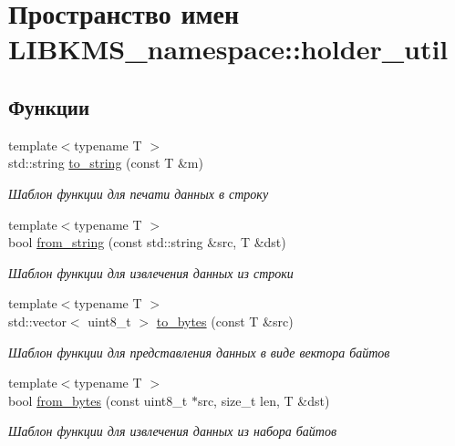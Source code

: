 \hypertarget{namespaceLIBKMS__namespace_1_1holder__util}{\section{Пространство имен L\-I\-B\-K\-M\-S\-\_\-namespace\-:\-:holder\-\_\-util}
\label{namespaceLIBKMS__namespace_1_1holder__util}
}
\subsection*{Функции}
\begin{DoxyCompactItemize}
\item 
{\footnotesize template$<$typename T $>$ }\\std\-::string \hyperlink{namespaceLIBKMS__namespace_1_1holder__util_a3f905fcf57ce738c4f3a82676d0cf590}{to\-\_\-string} (const T \&m)
\begin{DoxyCompactList}\small\item\em Шаблон функции для печати данных в строку \end{DoxyCompactList}\item 
{\footnotesize template$<$typename T $>$ }\\bool \hyperlink{namespaceLIBKMS__namespace_1_1holder__util_a0d969ce1aeb62ef97c3a280cfb000b31}{from\-\_\-string} (const std\-::string \&src, T \&dst)
\begin{DoxyCompactList}\small\item\em Шаблон функции для извлечения данных из строки \end{DoxyCompactList}\item 
{\footnotesize template$<$typename T $>$ }\\std\-::vector$<$ uint8\-\_\-t $>$ \hyperlink{namespaceLIBKMS__namespace_1_1holder__util_a80baff5a69342a580b476e44ee03fdbd}{to\-\_\-bytes} (const T \&src)
\begin{DoxyCompactList}\small\item\em Шаблон функции для представления данных в виде вектора байтов \end{DoxyCompactList}\item 
{\footnotesize template$<$typename T $>$ }\\bool \hyperlink{namespaceLIBKMS__namespace_1_1holder__util_a6b44331a32e5c812376a11812c500941}{from\-\_\-bytes} (const uint8\-\_\-t $\ast$src, size\-\_\-t len, T \&dst)
\begin{DoxyCompactList}\small\item\em Шаблон функции для извлечения данных из набора байтов \end{DoxyCompactList}\item 

\end{DoxyCompactItemize}
